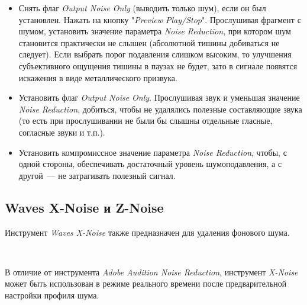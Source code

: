 \documentclass{beamer}
\begin{document}
\begin{frame}
\begin{itemize}
    \item Снять флаг \textit{Output Noise Only} (выводить только шум), если он был установлен. Нажать на кнопку "\textit{Preview Play/Stop}". Прослушивая фрагмент с шумом, установить значение параметра \textit{Noise Reduction}, при котором шум становится практически не слышен (абсолютной тишины добиваться не следует). Если выбрать порог подавления слишком высоким, то улучшения субъективного ощущения тишины в паузах не будет, зато в сигнале появятся искажения в виде металлического призвука.
    \item Установить флаг \textit{Output Noise Only}. Прослушивая звук и уменьшая значение \textit{Noise Reduction}, добиться, чтобы не удалялись полезные составляющие звука (то есть при прослушивании не были бы слышны отдельные гласные, согласные звуки и т.п.).
    \item Установить компромиссное значение параметра \textit{Noise Reduction}, чтобы, с одной стороны, обеспечивать достаточный уровень шумоподавления, а с другой~--– не затрагивать полезный сигнал.
\end{itemize}
\end{frame}

\subsection{Waves X-Noise и Z-Noise}
\begin{frame}
Инструмент \emph{Waves X-Noise} также предназначен для удаления фонового шума. 

~

В отличие от инструмента \textit{Adobe Audition Noise Reduction}, инструмент \emph{X-Noise} может быть использован в режиме реального времени после предварительной настройки профиля шума.

\end{frame}
\end{document}
